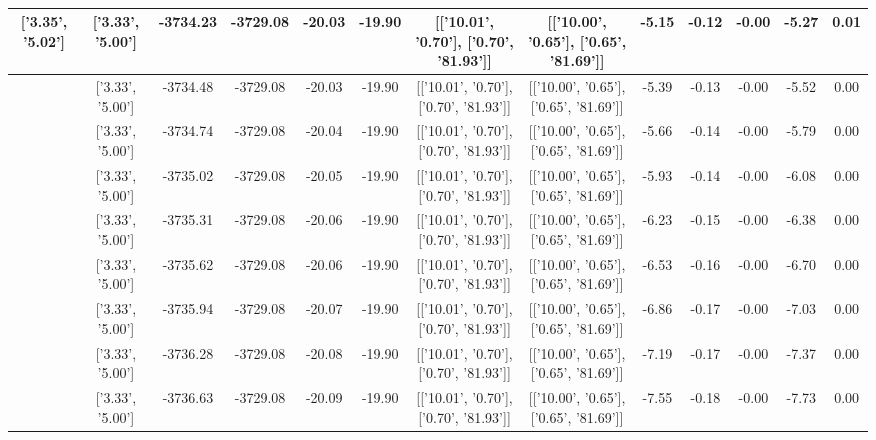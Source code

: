 \begin{table}[htbp]
\begin{adjustbox}{angle=90}
\begin{tabular}{|c|c|c|c|c|c|c|c|c|c|c|c|c|}
 ['3.35', '5.02'] & ['3.33', '5.00'] & -3734.23 & -3729.08 & -20.03 & -19.90 & [['10.01', '0.70'], ['0.70', '81.93']] & [['10.00', '0.65'], ['0.65', '81.69']] & -5.15 & -0.12 & -0.00 & -5.27 & 0.01\\ \hline
 ['3.35', '5.02'] & ['3.33', '5.00'] & -3734.48 & -3729.08 & -20.03 & -19.90 & [['10.01', '0.70'], ['0.70', '81.93']] & [['10.00', '0.65'], ['0.65', '81.69']] & -5.39 & -0.13 & -0.00 & -5.52 & 0.00\\ \hline
 ['3.35', '5.02'] & ['3.33', '5.00'] & -3734.74 & -3729.08 & -20.04 & -19.90 & [['10.01', '0.70'], ['0.70', '81.93']] & [['10.00', '0.65'], ['0.65', '81.69']] & -5.66 & -0.14 & -0.00 & -5.79 & 0.00\\ \hline
 ['3.35', '5.02'] & ['3.33', '5.00'] & -3735.02 & -3729.08 & -20.05 & -19.90 & [['10.01', '0.70'], ['0.70', '81.93']] & [['10.00', '0.65'], ['0.65', '81.69']] & -5.93 & -0.14 & -0.00 & -6.08 & 0.00\\ \hline
 ['3.35', '5.02'] & ['3.33', '5.00'] & -3735.31 & -3729.08 & -20.06 & -19.90 & [['10.01', '0.70'], ['0.70', '81.93']] & [['10.00', '0.65'], ['0.65', '81.69']] & -6.23 & -0.15 & -0.00 & -6.38 & 0.00\\ \hline
 ['3.36', '5.02'] & ['3.33', '5.00'] & -3735.62 & -3729.08 & -20.06 & -19.90 & [['10.01', '0.70'], ['0.70', '81.93']] & [['10.00', '0.65'], ['0.65', '81.69']] & -6.53 & -0.16 & -0.00 & -6.70 & 0.00\\ \hline
 ['3.36', '5.02'] & ['3.33', '5.00'] & -3735.94 & -3729.08 & -20.07 & -19.90 & [['10.01', '0.70'], ['0.70', '81.93']] & [['10.00', '0.65'], ['0.65', '81.69']] & -6.86 & -0.17 & -0.00 & -7.03 & 0.00\\ \hline
 ['3.36', '5.02'] & ['3.33', '5.00'] & -3736.28 & -3729.08 & -20.08 & -19.90 & [['10.01', '0.70'], ['0.70', '81.93']] & [['10.00', '0.65'], ['0.65', '81.69']] & -7.19 & -0.17 & -0.00 & -7.37 & 0.00\\ \hline
 ['3.36', '5.02'] & ['3.33', '5.00'] & -3736.63 & -3729.08 & -20.09 & -19.90 & [['10.01', '0.70'], ['0.70', '81.93']] & [['10.00', '0.65'], ['0.65', '81.69']] & -7.55 & -0.18 & -0.00 & -7.73 & 0.00\\ \hline
            \end{tabular}
        \end{adjustbox}
        \caption{}
        \label{}
    \end{table}
    